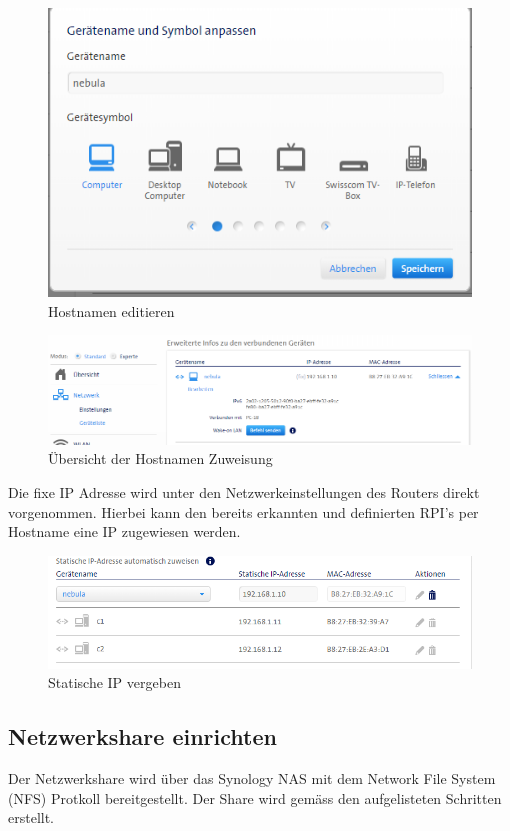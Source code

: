 \begin{figure}[H]
	\centering
	\includegraphics[scale=0.8]{Bilder/hostnamen_mac_edit.png}
	\caption{Hostnamen editieren}
\end{figure}
\begin{figure}[H]
	\centering
	\includegraphics[scale=0.6]{Bilder/hostnamen_mac_overview.png}
	\caption{Übersicht der Hostnamen Zuweisung}
\end{figure}

Die fixe IP Adresse wird unter den Netzwerkeinstellungen des Routers direkt vorgenommen. Hierbei kann den bereits erkannten und definierten RPI's per Hostname eine IP zugewiesen werden.
\begin{figure}[H]
	\centering
	\includegraphics[scale=0.8]{Bilder/ip_mac_edit.png}
	\caption{Statische IP vergeben}
\end{figure}

\subsection{Netzwerkshare einrichten}
Der Netzwerkshare wird über das Synology NAS mit dem Network File System (NFS) Protkoll bereitgestellt. Der Share wird gemäss den aufgelisteten Schritten erstellt. \newline

